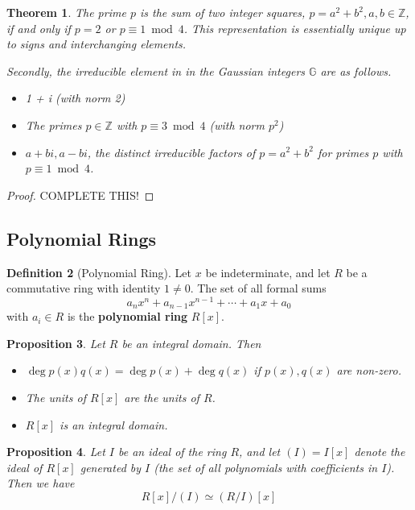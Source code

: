 \documentclass[10pt, oneside, reqno]{amsart}
\theoremstyle{plain}%
\newtheorem{thm}{Theorem}[section]
\newtheorem{prop}[thm]{Proposition}
\theoremstyle{definition}
\newtheorem{defn}[thm]{Definition}
\theoremstyle{remark}
\newcommand{\Z}{\mathbb{Z}}
\newcommand{\Ga}{\mathbb{G}}
\begin{document}
\begin{thm}
    The prime $p$ is the sum of two integer squares, $p = a^2 + b^2, a,b \in \Z$, if and only if $p = 2$ or $p \equiv 1 \bmod 4$.  This representation is essentially unique up to signs and interchanging elements.
    
    Secondly, the irreducible element in in the Gaussian integers $\Ga$ are as follows.
    \begin{itemize}
        \item 1 + i (with norm 2)
        \item The primes $p \in \Z$ with $p \equiv 3 \bmod 4$ (with norm $p^2$)
        \item $a + bi, a-bi$, the distinct irreducible factors of $p = a^2 + b^2$ for primes $p$ with $p \equiv 1 \bmod 4$.
    \end{itemize} 
\end{thm}

\begin{proof}
    COMPLETE THIS!
\end{proof}

\subsection{Polynomial Rings} %
\label{sub:polynomial_rings}

\begin{defn}[Polynomial Ring]
    Let $x$ be indeterminate, and let $R$ be a commutative ring with identity $1 \neq 0$.  The set of all formal sums \[
        a_n x^n + a_{n-1} x^{n-1} + \cdots + a_1 x + a_0 
    \] with $a_i \in R$ is the \textbf{polynomial ring} $R[x]$.
\end{defn}

\begin{prop}
    Let $R$ be an integral domain.  Then
    \begin{itemize}
        \item $\deg p(x) q(x) = \deg p(x) + \deg q(x)$ if $p(x), q(x)$ are non-zero.
        \item The units of $R[x]$ are the units of $R$.
        \item $R[x]$ is an integral domain.
    \end{itemize}
\end{prop}

\begin{prop}
    Let $I$ be an ideal of the ring $R$, and let $(I) = I[x]$ denote the ideal of $R[x]$ generated by $I$ (the set of all polynomials with coefficients in $I$).  Then we have\[
        R[x]/(I) \simeq (R/I)[x]
    \] 
\end{prop}
\end{document}
